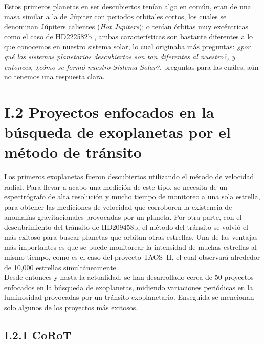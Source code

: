 Estos primeros planetas en ser descubiertos tenían algo en común, eran de una masa similar a la de Júpiter con periodos orbitales cortos, los cuales se denominan Júpiters calientes (\textit{Hot Jupiters}); o tenían órbitas muy excéntricas como el caso de HD222582b \cite{vogt2000six}, ambas características son bastante diferentes a lo que conocemos en nuestro sistema solar, lo cual originaba más preguntas: \textit{¿por qué los sistemas planetarios descubiertos son tan diferentes al nuestro?, y entonces, ¿cómo se formó nuestro Sistema Solar?}, preguntas para las cuáles, aún no tenemos una respuesta clara.\\ 

\section*{I.2 Proyectos enfocados en la búsqueda de exoplanetas por el método de tránsito}

Los primeros exoplanetas fueron descubiertos utilizando el método de velocidad radial. Para llevar a acabo una medición de este tipo, se necesita de un espectrógrafo de alta resolución y mucho tiempo de monitoreo a una sola estrella, para obtener las mediciones de velocidad que corroboren la existencia de anomalías gravitacionales provocadas por un planeta. Por otra parte, con el descubrimiento del tránsito de HD209458b, el método del tránsito se volvió el más exitoso para buscar planetas que orbitan otras estrellas. Una de las ventajas más importantes es que se puede monitorear la intensidad de muchas estrellas al mismo tiempo, como es el caso del proyecto TAOS~II, el cual observará alrededor de 10,000 estrellas simultáneamente.\\

Desde entonces y hasta la actualidad, se han desarrollado cerca de 50 proyectos enfocados en la búsqueda de exoplanetas, midiendo variaciones periódicas en la luminosidad provocadas por un tránsito exoplanetario. Enseguida se mencionan solo algunos de los proyectos más exitosos.\\



\subsection*{I.2.1 CoRoT}

